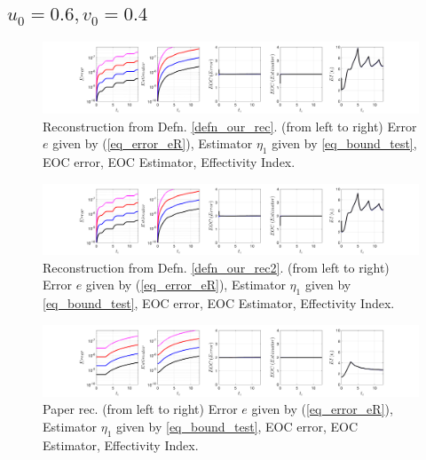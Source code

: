 \documentclass[12pt,a4paper]{article}
\numberwithin{equation}{section}
\theoremstyle{definition}
\begin{document}
\subsection*{$u_0=0.6, v_0= 0.4$}
\begin{figure}[H]
	\hspace{-3cm}
	\includegraphics[scale=0.55]{fig_LeapFrogplots_1x5_sin_IC_harmonic_order_2_u6_v4_rec_george}	
	\caption{Reconstruction from Defn. \ref{defn_our_rec}. (from left to right) Error $e$ given by (\ref{eq_error_eR}), Estimator $\eta_1$ given by \ref{eq_bound_test}, EOC error, EOC Estimator, Effectivity Index.}
	\label{fig_all_in_one_our_rec_george_u6_v4}
\end{figure}
\begin{figure}[H]
	\hspace{-3cm}
	\includegraphics[scale=0.55]{fig_LeapFrogplots_1x5_sin_IC_harmonic_order_2_u6_v4_rec2}	
	\caption{Reconstruction from Defn. \ref{defn_our_rec2}. (from left to right) Error $e$ given by (\ref{eq_error_eR}), Estimator $\eta_1$ given by \ref{eq_bound_test},  EOC error, EOC Estimator, Effectivity Index.}
	\label{fig_all_in_one_our_rec_2_u6_v4}
\end{figure}
\begin{figure}[H]
	\hspace{-3cm}
	\includegraphics[scale=0.55]{fig_LeapFrogplots_1x5_sin_IC_harmonic_u6_v4_paperrec}	
	\caption{Paper rec. (from left to right) Error $e$ given by (\ref{eq_error_eR}), Estimator $\eta_1$ given by \ref{eq_bound_test},  EOC error, EOC Estimator, Effectivity Index.}
	\label{fig_all_in_one_paperrec_u06_v04}
\end{figure}
\end{document}
